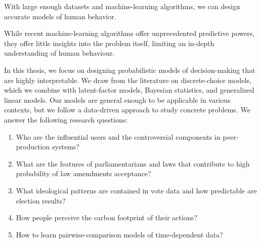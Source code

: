 With large enough datasets and machine-learning algorithms, we can design accurate models of human behavior.

While recent machine-learning algorithms offer unprecedented predictive powers, they offer little insights into the problem itself, limiting an in-depth understanding of human behaviour.

In this thesis, we focus on designing probabilistic models of decision-making that are highly interpretable.
We draw from the literature on discrete-choice models, which we combine with latent-factor models, Bayesian statistics, and generalized linear models.
Our models are general enough to be applicable in various contexts, but we follow a data-driven approach to study concrete problems.
We answer the following research questions:
\begin{enumerate}[
		label=\textbf{RQ\arabic*}
	]
	\item Who are the influential users and the controversial components in peer-production systems?
	\item What are the features of parliamentarians and laws that contribute to high probability of law amendments acceptance?
	\item What ideological patterns are contained in vote data and how predictable are election results?
	\item How people perceive the carbon footprint of their actions?
	\item How to learn pairwise-comparison models of time-dependent data?
\end{enumerate}
